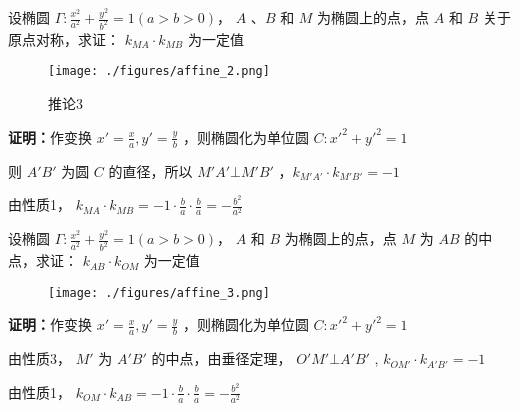 \begin{corollary}{}
设椭圆 $\displaystyle{\Gamma:\frac{x^2}{a^2}+\frac{y^2}{b^2}=1(a>b>0)}$， $\displaystyle{A}$ 、$\displaystyle{B}$ 和 $\displaystyle{M}$ 为椭圆上的点，点 $\displaystyle{A}$ 和 $\displaystyle{B}$ 关于原点对称，求证： $\displaystyle{k_{MA}\cdot k_{MB}}$ 为一定值

\begin{figure}[ht]
\centering
\texttt{[image: ./figures/affine\_2.png]}
\caption{推论3} \label{affine_fig2}
\end{figure}

\textbf{证明：}作变换 $\displaystyle{x'=\frac{x}{a},y'=\frac{y}{b}}$ ，则椭圆化为单位圆 $\displaystyle{C:x'^2+y'^2=1}$

则 $\displaystyle{A'B'}$ 为圆 $\displaystyle{C}$ 的直径，所以 $\displaystyle{M'A'\bot M'B'}$ ，$\displaystyle{k_{M'A'}\cdot k_{M'B'}=-1}$

由性质1， $\displaystyle{k_{MA}\cdot k_{MB}=-1\cdot \frac{b}{a}\cdot \frac{b}{a}=-\frac{b^2}{a^2}}$

\end{corollary}

\begin{corollary}{}
设椭圆 $\displaystyle{\Gamma:\frac{x^2}{a^2}+\frac{y^2}{b^2}=1(a>b>0)}$， $\displaystyle{A}$ 和 $\displaystyle{B}$ 为椭圆上的点，点 $\displaystyle{M}$ 为 $\displaystyle{AB}$ 的中点，求证： $\displaystyle{k_{AB}\cdot k_{OM}}$ 为一定值

\begin{figure}[ht]
\centering
\texttt{[image: ./figures/affine\_3.png]}
\caption{} \label{affine_fig3}
\end{figure}

\textbf{证明：}作变换 $\displaystyle{x'=\frac{x}{a},y'=\frac{y}{b}}$ ，则椭圆化为单位圆 $\displaystyle{C:x'^2+y'^2=1}$

由性质3， $\displaystyle{M'}$ 为 $\displaystyle{A'B'}$ 的中点，由垂径定理， $\displaystyle{O'M'\bot A'B'}$ , $\displaystyle{k_{OM'}\cdot k_{A'B'}=-1}$

由性质1， $\displaystyle{k_{OM}\cdot k_{AB}=-1\cdot \frac{b}{a}\cdot \frac{b}{a}=-\frac{b^2}{a^2}}$

\end{corollary} 

